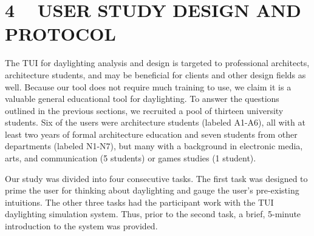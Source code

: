 \documentclass{article}
\begin{document}
\section{4 ~ USER STUDY DESIGN AND PROTOCOL}


The TUI for daylighting analysis and design is targeted to
professional architects, architecture students, and may be beneficial
for clients and other design fields as well.  Because our tool does
not require much training to use, we claim it is a valuable general
educational tool for daylighting.  To answer the questions outlined in
the previous sections, we recruited a pool of thirteen university
students.  Six of the users were architecture students (labeled
A1-A6), all with at least two years of formal architecture education
and seven students from other departments (labeled N1-N7), but many
with a background in electronic media, arts, and communication (5
students) or games studies (1 student).

Our study was divided into four consecutive tasks.  The first task was
designed to prime the user for thinking about daylighting and gauge
the user's pre-existing intuitions.  The other three tasks had the
participant work with the TUI daylighting simulation system.  Thus,
prior to the second task, a brief, 5-minute introduction to the system
was provided. 
%



\end{document}
